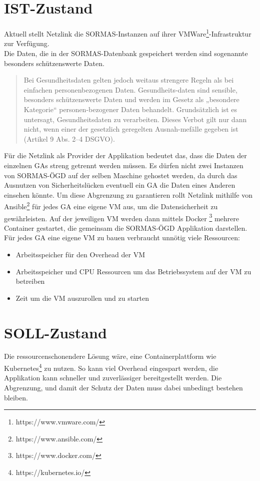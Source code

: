 \section{IST-Zustand}
Aktuell stellt Netzlink die \ac{SORMAS}-Instanzen auf ihrer VMWare\footnote{https://www.vmware.com/}-Infrastruktur zur Verfügung. 
\\
Die Daten, die in der \ac{SORMAS}-Datenbank gespeichert werden sind sogenannte besonders schützenswerte Daten.
\begin{quote}
    Bei Gesundheitsdaten gelten jedoch weitaus strengere Regeln als bei einfachen personenbezogenen Daten. Gesundheits-daten sind sensible, besonders schützenswerte Daten und werden im Gesetz als „besondere Kategorie“ personen-bezogener Daten behandelt. Grundsätzlich ist es untersagt, Gesundheitsdaten zu verarbeiten. Dieses Verbot gilt nur dann nicht, wenn einer der gesetzlich geregelten Ausnah-mefälle gegeben ist (Artikel 9 Abs. 2–4 DSGVO). 
    \cite{Gesundheitsdatenschutz}
\end{quote}
Für die Netzlink als Provider der Applikation bedeutet das, dass die Daten der einzelnen \ac{GAs} streng getrennt werden müssen. 
Es dürfen nicht zwei Instanzen von \ac{SORMAS-ÖGD} auf der selben Maschine gehostet werden, da durch das Ausnutzen von Sicherheitslücken eventuell ein \ac{GA} die Daten eines Anderen einsehen könnte.
Um diese Abgrenzung zu garantieren rollt Netzlink mithilfe von Ansible\footnote{https://www.ansible.com/} für jedes \ac{GA} eine eigene \ac{VM} aus, um die Datensicherheit zu gewährleisten.
Auf der jeweiligen \ac{VM} werden dann mittels Docker \footnote{https://www.docker.com/} mehrere Container gestartet, die gemeinsam die \ac{SORMAS-ÖGD} Applikation darstellen.
\\
Für jedes \ac{GA} eine eigene VM zu bauen verbraucht unnötig viele Ressourcen:
\begin{itemize}
    \item Arbeitsspeicher für den Overhead der \ac{VM}
    \item Arbeitsspeicher und CPU Ressourcen um das Betriebssystem auf der \ac{VM} zu betreiben
    \item Zeit um die \ac{VM} auszurollen und zu starten 
\end{itemize}

\section{SOLL-Zustand}
Die ressourcenschonendere Lösung wäre, eine Containerplattform wie Kubernetes\footnote{https://kubernetes.io/} zu nutzen.
So kann viel Overhead eingespart werden, die Applikation kann schneller und zuverlässiger bereitgestellt werden. 
Die Abgrenzung, und damit der Schutz der Daten muss dabei unbedingt bestehen bleiben.

